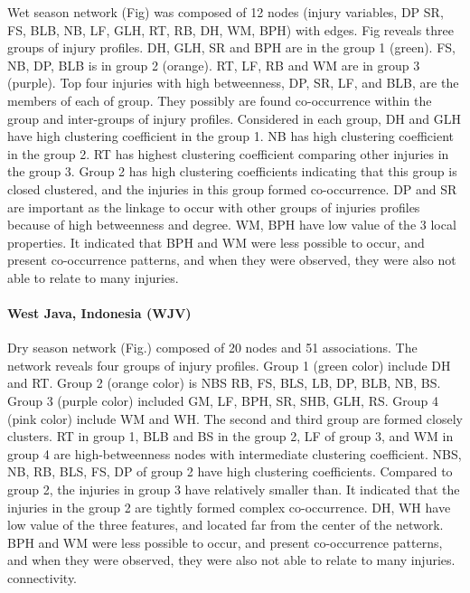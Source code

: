 Wet season network (Fig) was composed of 12 nodes (injury variables, DP SR, FS, BLB, NB, LF, GLH, RT, RB, DH, WM, BPH) with edges. Fig reveals three groups of injury profiles. DH, GLH, SR and BPH are in the group 1 (green).  FS, NB, DP, BLB is in group 2 (orange). RT, LF, RB and WM are in group 3 (purple). Top four injuries with high betweenness, DP, SR, LF, and BLB, are the members of each of group. They possibly are found co-occurrence within the group and inter-groups of injury profiles. Considered in each group, DH and GLH have high clustering coefficient in the group 1. NB has high clustering coefficient in the group 2. RT has highest clustering coefficient comparing other injuries in the group 3.  Group 2 has high clustering coefficients indicating that this group is closed clustered, and the injuries in this group formed co-occurrence.  DP and SR are important as the linkage to occur with other groups of injuries profiles because of high betweenness and degree. WM, BPH have low value of the 3 local properties. It indicated that BPH and WM were less possible to occur, and present co-occurrence patterns, and when they were observed, they were also not able to relate to many injuries. 

\paragraph{West Java, Indonesia (WJV)}
 
Dry season network (Fig.) composed of 20 nodes and 51 associations. The network reveals four groups of injury profiles. Group 1 (green color) include DH and RT. Group 2 (orange color) is NBS RB, FS, BLS, LB, DP, BLB, NB, BS. Group 3 (purple color) included GM, LF, BPH, SR, SHB, GLH, RS. Group 4 (pink color) include WM and WH.  The second and third group are formed closely clusters.  RT in group 1, BLB and BS in the group 2, LF of group 3, and WM in group 4 are high-betweenness nodes with intermediate clustering coefficient.  NBS, NB, RB, BLS, FS, DP of group 2 have high clustering coefficients. Compared to group 2, the injuries in group 3 have relatively smaller than. It indicated that the injuries in the group 2 are tightly formed complex co-occurrence.  DH, WH have low value of the three features, and located far from the center of the network. BPH and WM were less possible to occur, and present co-occurrence patterns, and when they were observed, they were also not able to relate to many injuries. connectivity.

